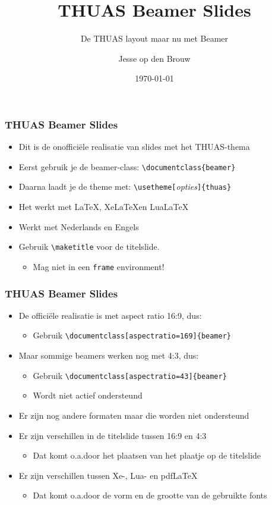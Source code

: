 \documentclass[fleqn,aspectratio=169,dutch,10pt]{beamer}
\title{THUAS Beamer Slides}
\subtitle{De THUAS layout maar nu met Beamer}
\author{Jesse op den Brouw}
\date{\today}
\begin{document}
\maketitle


\begin{frame}[fragile]
\frametitle{THUAS Beamer Slides}
\begin{itemize}
\item Dit is de onofficiële realisatie van slides met het THUAS-thema
\item Eerst gebruik je de beamer-class: \lstinline|\documentclass{beamer}|
\item Daarna laadt je de theme met: \lstinline|\usetheme[|\emph{\small opties}\lstinline|]{thuas}|
\item Het werkt met \LaTeX, Xe\LaTeX en Lua\LaTeX
\item Werkt met Nederlands en Engels
\item Gebruik \lstinline|\maketitle| voor de titelslide.
\begin{itemize}
\item Mag niet in een \lstinline|frame| environment!
\end{itemize}
\end{itemize}
\end{frame}


\begin{frame}[fragile]
\frametitle{THUAS Beamer Slides}
\begin{itemize}
\item De officiële realisatie is met aspect ratio 16:9, dus:
\begin{itemize}
\item Gebruik \lstinline|\documentclass[aspectratio=169]{beamer}|
\end{itemize}
\item Maar sommige beamers werken nog met 4:3, dus:
\begin{itemize}
\item Gebruik \lstinline|\documentclass[aspectratio=43]{beamer}|
\item Wordt niet actief ondersteund
\end{itemize}
\item Er zijn nog andere formaten maar die worden niet ondersteund
\item Er zijn verschillen in de titelslide tussen 16:9 en 4:3
\begin{itemize}
\item Dat komt o.a.\@ door het plaatsen van het plaatje op de titelslide
\end{itemize}
\item Er zijn verschillen tussen Xe-, Lua- en pdf\LaTeX
\begin{itemize}
\item Dat komt o.a.\@ door de vorm en de grootte van de gebruikte fonts
\end{itemize}
\end{itemize}
\end{frame}
\end{document}
